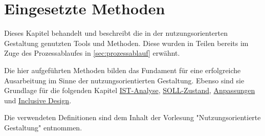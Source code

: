 \chapter{Eingesetzte Methoden}\label{sec:methoden}

Dieses Kapitel behandelt und beschreibt die in der nutzungsorienterten Gestaltung genutzten Tools und Methoden.
Diese wurden in Teilen bereits im Zuge des Prozessablaufes in \autoref{sec:prozessablauf} erwähnt.

Die hier aufgeführten Methoden bilden das Fundament für eine erfolgreiche Ausarbeitung im Sinne der nutzungsorientierten Gestaltung.
Ebenso sind sie Grundlage für die folgenden Kapitel \hyperref[sec:anwendung]{IST-Analyse}, \hyperref[sec:gestaltung]{SOLL-Zustand}, \hyperref[sec:feedback]{Anpassungen} und \hyperref[sec:incdes]{Inclusive Design}.

Die verwendeten Definitionen sind dem Inhalt der Vorlesung "Nutzungsorientierte Gestaltung" \cite{NOG} entnommen.